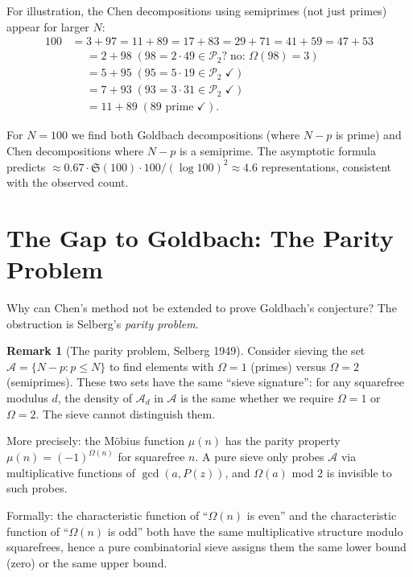 \documentclass[12pt,a4paper]{amsart}
\theoremstyle{definition}
\newtheorem{remark}[theorem]{Remark}
\newcommand{\Ptwo}{\mathcal{P}_2}
\newcommand{\OOmega}{\Omega}   %
\begin{document}
\medskip
For illustration, the Chen decompositions using semiprimes (not just primes)
appear for larger $N$:
\begin{align*}
  100 &= 3 + 97 = 11 + 89 = 17 + 83 = 29 + 71 = 41 + 59 = 47 + 53 \\
      &\phantom{{}={}}
        = 2 + 98\;(98 = 2\cdot 49 \in \Ptwo?\;\text{no: }\OOmega(98)=3)\\
      &\phantom{{}={}}
        = 5 + 95\;(95 = 5\cdot 19 \in \Ptwo\;{\checkmark}) \\
      &\phantom{{}={}}
        = 7 + 93\;(93 = 3\cdot 31 \in \Ptwo\;{\checkmark}) \\
      &\phantom{{}={}}
        = 11 + 89\;(89 \text{ prime}\;{\checkmark}).
\end{align*}

For $N = 100$ we find both Goldbach decompositions (where $N-p$ is prime)
and Chen decompositions where $N-p$ is a semiprime.  The asymptotic formula
predicts $\approx 0.67 \cdot \mathfrak{S}(100) \cdot 100/(\log 100)^2 \approx 4.6$
representations, consistent with the observed count.

\section{The Gap to Goldbach: The Parity Problem}\label{sec:parity}

Why can Chen's method not be extended to prove Goldbach's conjecture?
The obstruction is Selberg's \emph{parity problem}.

\begin{remark}[The parity problem, Selberg 1949]
  Consider sieving the set $\mathcal{A} = \{N - p : p \leq N\}$ to find
  elements with $\OOmega = 1$ (primes) versus $\OOmega = 2$ (semiprimes).
  These two sets have the same ``sieve signature'': for any squarefree
  modulus $d$, the density of $\mathcal{A}_d$ in $\mathcal{A}$ is the same
  whether we require $\OOmega = 1$ or $\OOmega = 2$.  The sieve cannot
  distinguish them.

  More precisely: the Möbius function $\mu(n)$ has the parity property
  $\mu(n) = (-1)^{\OOmega(n)}$ for squarefree $n$.  A pure sieve only
  probes $\mathcal{A}$ via multiplicative functions of $\gcd(a, P(z))$,
  and $\OOmega(a)$ mod $2$ is invisible to such probes.

  Formally: the characteristic function of ``$\OOmega(n)$ is even'' and
  the characteristic function of ``$\OOmega(n)$ is odd'' both have the
  same multiplicative structure modulo squarefrees, hence a pure combinatorial
  sieve assigns them the same lower bound (zero) or the same upper bound.
\end{remark}
\end{document}
